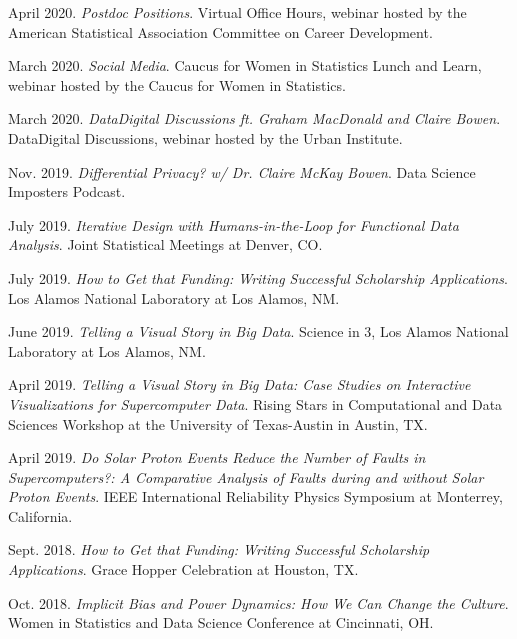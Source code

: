 \documentclass[11pt, letterpaper, roman]{moderncv} %
\begin{document}
\begin{etaremune}[topsep=0pt, itemsep=6pt, partopsep=0pt, parsep=0pt]
  \item April 2020. \textit{Postdoc Positions}. Virtual Office Hours, webinar hosted by the American Statistical Association Committee on Career Development.
  
  \item March 2020. \textit{Social Media}. Caucus for Women in Statistics Lunch and Learn, webinar hosted by the Caucus for Women in Statistics.

  \item March 2020. \textit{Data\@Urban Digital Discussions ft. Graham MacDonald and Claire Bowen}. Data\@Urban Digital Discussions, webinar hosted by the Urban Institute.
  
  \item Nov. 2019. \textit{Differential Privacy? w/ Dr. Claire McKay Bowen}. Data Science Imposters Podcast.
  
  \item July 2019. \textit{Iterative Design with Humans-in-the-Loop for Functional Data Analysis}. Joint Statistical Meetings at Denver, CO. 

  \item July 2019. \textit{How to Get that Funding: Writing Successful Scholarship Applications}. Los Alamos National Laboratory at Los Alamos, NM.

  \item June 2019. \textit{Telling a Visual Story in Big Data}. Science in 3, Los Alamos National Laboratory at Los Alamos, NM. 
  
  \item April 2019. \textit{Telling a Visual Story in Big Data: Case Studies on Interactive Visualizations for Supercomputer Data}. Rising Stars in Computational and Data Sciences Workshop at the University of Texas-Austin in Austin, TX.

  \item April 2019. \textit{Do Solar Proton Events Reduce the Number of Faults in Supercomputers?: A Comparative Analysis of Faults during and without Solar Proton Events}. IEEE International Reliability Physics Symposium at Monterrey, California.
  
  \item Sept. 2018. \textit{How to Get that Funding: Writing Successful Scholarship Applications}. Grace Hopper Celebration at Houston, TX.
  
  \item Oct. 2018. \textit{Implicit Bias and Power Dynamics: How We Can Change the Culture}. Women in Statistics and Data Science Conference at Cincinnati, OH.


\end{etaremune}
\end{document}
